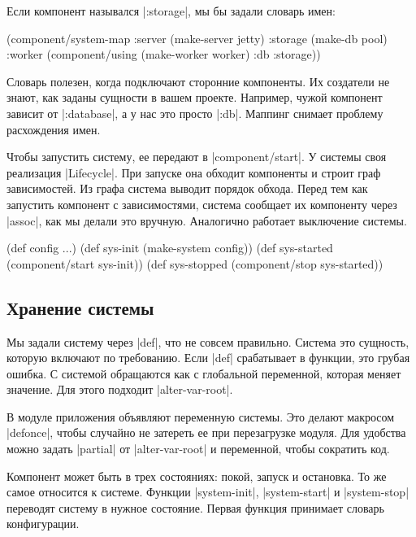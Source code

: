 Если компонент назывался \spverb|:storage|, мы бы задали словарь имен:

\begin{english}
  \begin{clojure}
(component/system-map
 :server  (make-server jetty)
 :storage (make-db pool)
 :worker  (component/using
           (make-worker worker) {:db :storage}))
  \end{clojure}
\end{english}

Словарь полезен, когда подключают сторонние компоненты. Их создатели не знают,
как заданы сущности в вашем проекте. Например, чужой компонент зависит от
\spverb|:database|, а у нас это просто \spverb|:db|. Маппинг снимает проблему
расхождения имен.

Чтобы запустить систему, ее передают в \spverb|component/start|. У системы своя
реализация \spverb|Lifecycle|. При запуске она обходит компоненты и строит граф
зависимостей. Из графа система выводит порядок обхода. Перед тем как запустить
компонент с зависимостями, система сообщает их компоненту через \spverb|assoc|,
как мы делали это вручную. Аналогично работает выключение системы.

\begin{english}
  \begin{clojure}
(def config {...})
(def sys-init (make-system config))
(def sys-started (component/start sys-init))
(def sys-stopped (component/stop sys-started))
  \end{clojure}
\end{english}

\subsection{Хранение системы}

Мы задали систему через \spverb|def|, что не совсем правильно. Система это
сущность, которую включают по требованию. Если \spverb|def| срабатывает в
функции, это грубая ошибка. С системой обращаются как с глобальной переменной,
которая меняет значение. Для этого подходит \spverb|alter-var-root|.

В модуле приложения объявляют переменную системы. Это делают макросом
\spverb|defonce|, чтобы случайно не затереть ее при перезагрузке модуля. Для
удобства можно задать \spverb|partial| от \spverb|alter-var-root| и переменной,
чтобы сократить код.

Компонент может быть в трех состояниях: покой, запуск и остановка. То же самое
относится к системе. Функции \spverb|system-init|, \spverb|system-start| и
\spverb|system-stop| переводят систему в нужное состояние. Первая функция
принимает словарь конфигурации.

